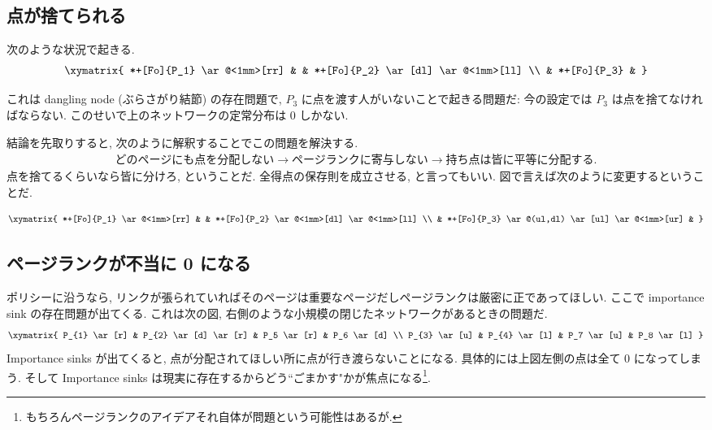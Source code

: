 \documentclass[openany, a4paper, oneside]{jsbook}
\begin{document}
\subsection{点が捨てられる}

次のような状況で起きる.
\begin{gather}
 \xymatrix{
  *+[Fo]{P_1} \ar@<1mm>[rr] & & *+[Fo]{P_2} \ar[dl] \ar@<1mm>[ll] \\
  & *+[Fo]{P_3} &
 }
\end{gather}

これは dangling node (ぶらさがり結節) の存在問題で,
$P_3$ に点を渡す人がいないことで起きる問題だ: 今の設定では $P_3$ は点を捨てなければならない.
このせいで上のネットワークの定常分布は 0 しかない.

結論を先取りすると, 次のように解釈することでこの問題を解決する.
\begin{align}
 \text{どのページにも点を分配しない}
 \to \text{ページランクに寄与しない}
 \to \text{持ち点は皆に平等に分配する}.
\end{align}
点を捨てるくらいなら皆に分けろ, ということだ.
全得点の保存則を成立させる, と言ってもいい.
図で言えば次のように変更するということだ.

\begin{gather}
 \xymatrix{
   *+[Fo]{P_1} \ar@<1mm>[rr] & & *+[Fo]{P_2} \ar@<1mm>[dl] \ar@<1mm>[ll] \\
   & *+[Fo]{P_3} \ar@(ul,dl) \ar[ul] \ar@<1mm>[ur] &
 }
\end{gather}
\subsection{ページランクが不当に 0 になる}

ポリシーに沿うなら, リンクが張られていればそのページは重要なページだしページランクは厳密に正であってほしい.
ここで importance sink の存在問題が出てくる.
これは次の図, 右側のような小規模の閉じたネットワークがあるときの問題だ.
\begin{align}
 \xymatrix{
  P_{1} \ar[r] & P_{2} \ar[d] \ar[r] & P_5 \ar[r] & P_6 \ar[d] \\
  P_{3} \ar[u] & P_{4} \ar[l]        & P_7 \ar[u] & P_8 \ar[l]
 }
\end{align}
Importance sinks が出てくると, 点が分配されてほしい所に点が行き渡らないことになる.
具体的には上図左側の点は全て 0 になってしまう.
そして Importance sinks は現実に存在するからどう``ごまかす"かが焦点になる\footnote{もちろんページランクのアイデアそれ自体が問題という可能性はあるが.}.
\end{document}

